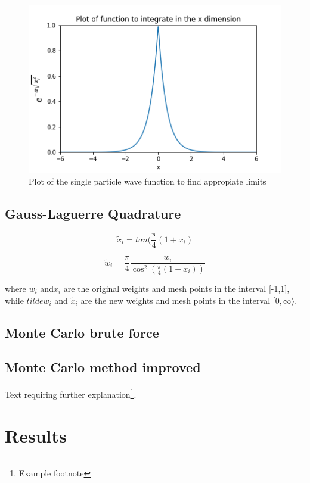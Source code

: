 \documentclass[twoside,twocolumn]{article}
\begin{document}
\begin{figure}[h]
\center
\includegraphics[scale=0.55]{figure1.png}
\caption{Plot of the single particle wave function to find appropiate limits}
\end{figure}
\subsection{Gauss-Laguerre Quadrature}

\begin{equation}
	\tilde{x}_i = tan(\frac{\pi}{4}(1+x_i)
\end{equation}

\begin{equation}
	\tilde{w}_i = \frac{\pi}{4}\frac{w_i}{\cos^2(\frac{\pi}{4}(1+x_i))}
\end{equation}

where $w_i$ and$x_i$ are the original weights and mesh points in the interval [-1,1], while $tilde{w}_i$ and $\tilde{x}_i$ are the new weights and mesh points in the interval $[0,\infty\rangle$.
\subsection{Monte Carlo brute force}
\subsection{Monte Carlo method improved}

Text requiring further explanation\footnote{Example footnote}.


\section{Results}
\end{document}
